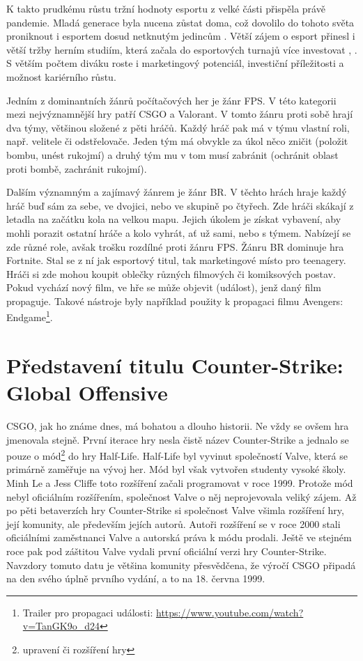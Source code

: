 K takto prudkému růstu tržní hodnoty esportu z velké části přispěla právě pandemie. Mladá generace byla nucena zůstat doma, což dovolilo do tohoto světa proniknout i esportem
dosud netknutým jedincům . Větší zájem o esport přinesl i větší tržby herním studiím, která začala do esportových turnajů více investovat \cite{professeur_esea_2022},
\cite{liquipedianet_pgl_2021}. S větším počtem diváku roste i marketingový potenciál, investiční příležitosti a možnost kariérního růstu.

Jedním z dominantních žánrů počítačových her je žánr \ac{FPS}. V této kategorii mezi nejvýznamnější hry patří \ac{CSGO} a Valorant. V tomto žánru proti sobě hrají dva týmy,
většinou složené z pěti hráčů. Každý hráč pak má v týmu vlastní roli, např. velitele či odstřelovače. Jeden tým má obvykle za úkol něco zničit (položit bombu, unést rukojmí)
a druhý tým mu v tom musí zabránit (ochránit oblast proti bombě, zachránit rukojmí).

Dalším významným a zajímavý žánrem je žánr \acf{BR}. V těchto hrách hraje každý hráč buď sám za sebe, ve dvojici, nebo ve skupině po čtyřech. Zde hráči skákají z letadla na
začátku kola na velkou mapu. Jejich úkolem je získat vybavení, aby mohli porazit ostatní hráče a kolo vyhrát, ať už sami, nebo s týmem. Nabízejí se zde různé role, avšak trošku
rozdílné proti žánru \ac{FPS}. Žánru BR dominuje hra Fortnite. Stal se z ní jak esportový titul, tak marketingové místo pro teenagery.
Hráči si zde mohou koupit oblečky různých filmových či komiksových postav. Pokud vychází nový film, ve hře se může objevit  (událost),
jenž daný film propaguje. Takové nástroje byly například použity k propagaci filmu Avengers: Endgame\footnote{Trailer pro propagaci události:
\url{https://www.youtube.com/watch?v=TanGK9o_d24}}.

\section{Představení titulu Counter-Strike: Global Offensive}
\ac{CSGO}, jak ho známe dnes, má bohatou a dlouho historii. Ne vždy se ovšem hra jmenovala stejně. První iterace hry nesla čistě název Counter-Strike a jednalo se pouze o
mód\footnote{upravení či rozšíření hry} do hry Half-Life. Half-Life byl vyvinut společností Valve, která se primárně zaměřuje na vývoj her. Mód byl však
vytvořen studenty vysoké školy. Minh Le a Jess Cliffe toto rozšíření začali programovat v roce 1999. Protože mód nebyl oficiálním rozšířením, společnost Valve o něj neprojevovala
veliký zájem. Až po pěti betaverzích hry Counter-Strike si společnost Valve všimla rozšíření hry, její komunity, ale především jejích autorů. Autoři rozšíření se v roce 2000 stali
oficiálními zaměstnanci Valve a autorská práva k módu prodali. Ještě ve stejném roce pak pod záštitou Valve vydali první oficiální verzi hry Counter-Strike. Navzdory tomuto
 datu je většina komunity přesvědčena, že výročí \ac{CSGO} připadá na den svého úplně prvního vydání, a to na 18. června 1999.


